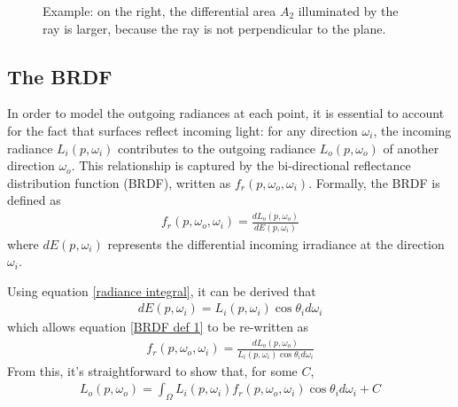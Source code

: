 \begin{figure}[H]
    

\caption{Example: on the right, the differential area $A_2$ illuminated by the ray is larger, because the ray is not perpendicular to the plane.}    
\end{figure}


\subsection{The BRDF}

In order to model the outgoing radiances at each point, it is essential to account for the fact that surfaces reflect incoming light: for any direction $\omega_i$, the incoming radiance $L_i(p,\omega_i)$ contributes to the outgoing radiance $L_o(p,\omega_o)$ of another direction $\omega_o$. This relationship is captured by the bi-directional reflectance distribution function (BRDF), written as $f_r(p,\omega_o,\omega_i)$. Formally, the BRDF is defined as 
\begin{align}
    f_r(p,\omega_o,\omega_i) = \frac{dL_o(p,\omega_o)}{dE(p,\omega_i)}
    \label{BRDF def 1}
\end{align}
where $dE(p,\omega_i)$ represents the differential incoming irradiance at the direction $\omega_i$.

Using equation \ref{radiance integral}, it can be derived that 
\begin{align}
    dE(p,\omega_i) = L_i(p,\omega_i)\cos\theta_id\omega_i
\end{align}
which allows equation \ref{BRDF def 1} to be re-written as
\begin{align}
    f_r(p,\omega_o,\omega_i) = \frac{dL_o(p,\omega_o)}{L_i(p,\omega_i)\cos\theta_id\omega_i}
\end{align}
From this, it's straightforward to show that, for some $C$,
\begin{align}
    L_o(p,\omega_o) = \int_\Omega L_i(p,\omega_i)f_r(p,\omega_o,\omega_i)\cos\theta_id\omega_i + C
    \label{reflection plus C}
\end{align}

